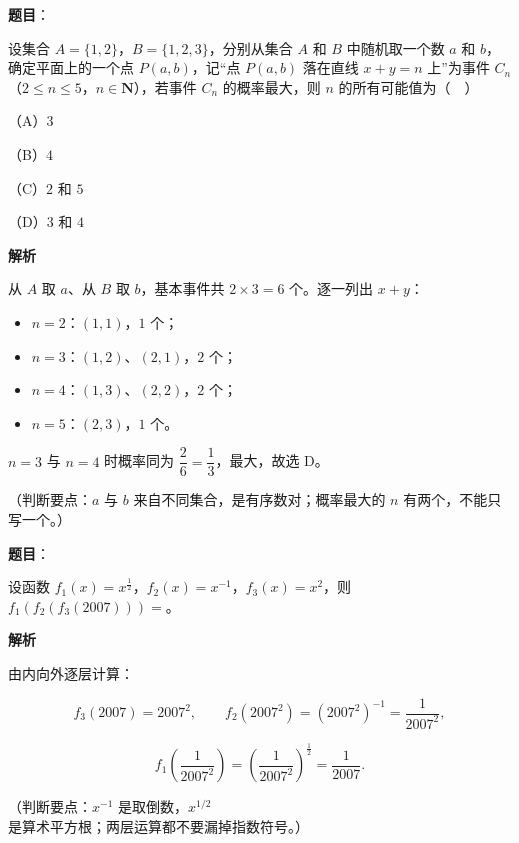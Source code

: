 \begin{answer}

\textbf{题目}：

设集合 $A=\{1,2\}$，$B=\{1,2,3\}$，分别从集合 $A$ 和 $B$ 中随机取一个数 $a$ 和 $b$，确定平面上的一个点 $P(a,b)$，记“点 $P(a,b)$ 落在直线 $x+y=n$ 上”为事件 $C_n$（$2\leqslant n\leqslant5$，$n\in\mathbf N$），若事件 $C_n$ 的概率最大，则 $n$ 的所有可能值为（　）

（A）$3$

（B）$4$

（C）$2$ 和 $5$

（D）$3$ 和 $4$

\textbf{解析}

从 $A$ 取 $a$、从 $B$ 取 $b$，基本事件共 $2\times3=6$ 个。逐一列出 $x+y$：

\begin{itemize}
\item $n=2$：$(1,1)$，$1$ 个；
\item $n=3$：$(1,2)$、$(2,1)$，$2$ 个；
\item $n=4$：$(1,3)$、$(2,2)$，$2$ 个；
\item $n=5$：$(2,3)$，$1$ 个。
\end{itemize}

$n=3$ 与 $n=4$ 时概率同为 $\dfrac{2}{6}=\dfrac13$，最大，故选 D。

（判断要点：$a$ 与 $b$ 来自不同集合，是有序数对；概率最大的 $n$ 有两个，不能只写一个。）


\end{answer}
\begin{answer}

\textbf{题目}：

设函数 $f_1(x)=x^{\frac12}$，$f_2(x)=x^{-1}$，$f_3(x)=x^2$，则 $f_1(f_2(f_3(2007)))=$\gkblank{}。

\textbf{解析}

由内向外逐层计算：

\nopagebreak[4]
\[f_3(2007)=2007^2,\qquad f_2(2007^2)=\left(2007^2\right)^{-1}=\frac{1}{2007^2},\]

\nopagebreak[4]
\[f_1\left(\frac{1}{2007^2}\right)=\left(\frac{1}{2007^2}\right)^{\frac12}=\frac{1}{2007}.\]

（判断要点：$x^{-1}$ 是取倒数，$x^{1/2}$ 是算术平方根；两层运算都不要漏掉指数符号。）


\end{answer}
